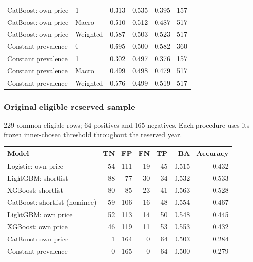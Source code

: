 \begin{longtable}{@{}p{.34\linewidth}p{.15\linewidth}rrrr@{}}
CatBoost: own price & 1 & 0.313 & 0.535 & 0.395 & 157\\
CatBoost: own price & Macro & 0.510 & 0.512 & 0.487 & 517\\
CatBoost: own price & Weighted & 0.587 & 0.503 & 0.523 & 517\\
Constant prevalence & 0 & 0.695 & 0.500 & 0.582 & 360\\
Constant prevalence & 1 & 0.302 & 0.497 & 0.376 & 157\\
Constant prevalence & Macro & 0.499 & 0.498 & 0.479 & 517\\
Constant prevalence & Weighted & 0.576 & 0.499 & 0.519 & 517\\
\bottomrule\end{longtable}\endgroup

\subsubsection*{Original eligible reserved sample}
229 common eligible rows; 64 positives and 165 negatives. Each procedure uses its frozen inner-chosen threshold throughout the reserved year.
\begingroup\small\setlength{\tabcolsep}{3pt}
\begin{longtable}{@{}p{.35\linewidth}rrrrrr@{}}
\toprule Model & TN & FP & FN & TP & BA & Accuracy\\\midrule\endhead
Logistic: own price & 54 & 111 & 19 & 45 & 0.515 & 0.432\\
LightGBM: shortlist & 88 & 77 & 30 & 34 & 0.532 & 0.533\\
XGBoost: shortlist & 80 & 85 & 23 & 41 & 0.563 & 0.528\\
CatBoost: shortlist (nominee) & 59 & 106 & 16 & 48 & 0.554 & 0.467\\
LightGBM: own price & 52 & 113 & 14 & 50 & 0.548 & 0.445\\
XGBoost: own price & 46 & 119 & 11 & 53 & 0.553 & 0.432\\
CatBoost: own price & 1 & 164 & 0 & 64 & 0.503 & 0.284\\
Constant prevalence & 0 & 165 & 0 & 64 & 0.500 & 0.279\\
\bottomrule\end{longtable}\endgroup
\begingroup\small\setlength{\tabcolsep}{3pt}
